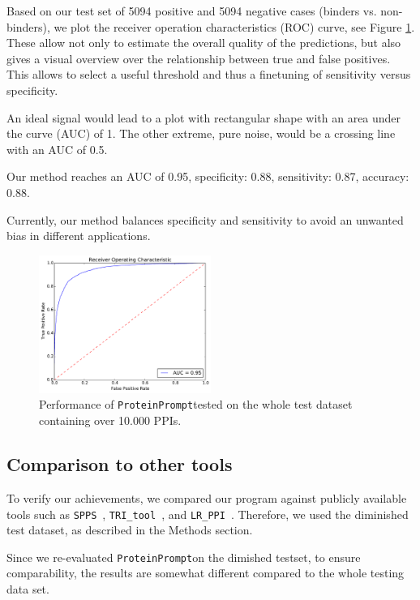 \documentclass[preprint,3p,times,twocolumn]{elsarticle}
\newcommand{\TODO}[1] {\begingroup\color{red}#1\endgroup}
\newcommand{\spps}{\texttt{SPPS}}
\newcommand{\tri}{\texttt{TRI\_tool}}
\newcommand{\lr}{\texttt{LR\_PPI}}
\newcommand{\toolblank}{\texttt{ProteinPrompt}}
\newcommand{\tool}{\toolblank\hspace{2pt}}
\begin{document}
Based on our test set of 5094 positive and 5094 negative cases
(binders vs. non-binders), we plot the receiver operation
characteristics (ROC) curve, see Figure \ref{fig:roc}.
These allow not only to estimate the overall quality of the predictions, but also
gives a visual overview over the relationship between true and false
positives. This allows to select a useful threshold and thus a
finetuning of sensitivity versus specificity.

An ideal signal would lead to a plot with rectangular shape
with an area under the curve (AUC) of 1. The other extreme, pure noise, would be a crossing
line with an AUC of 0.5.

Our method reaches an AUC of 0.95,
specificity: 0.88,
sensitivity: 0.87,
accuracy: 0.88.

Currently, our method balances specificity and sensitivity to avoid an
unwanted bias in different applications.

\begin{figure}[t]
\includegraphics[width=0.5\textwidth]{img/meta_final_roc.pdf}
\caption{Performance of \tool tested on the whole test dataset
  containing over 10.000 PPIs.}
\label{fig:roc}
\end{figure} 



\subsection{Comparison to other tools}

To verify our achievements, we compared our program against publicly
available tools such as \spps\ \cite{Liu:2012}, \tri\
\cite{Perovic:2017}, and \lr\ \cite{Pan:2010}. Therefore, we used the
diminished test dataset, as described in the Methods section. 

Since we re-evaluated \tool on the dimished testset, to ensure
comparability, the results are somewhat different compared to the
whole testing data set. 
\end{document}
